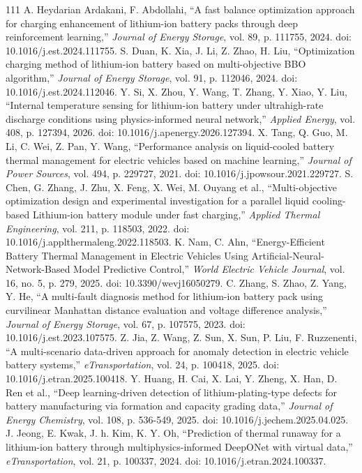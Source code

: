 \documentclass[journal]{IEEEtran}
\begin{document}
\begin{thebibliography}{111}
A. Heydarian Ardakani, F. Abdollahi, ``A fast balance optimization approach for charging enhancement of lithium-ion battery packs through deep reinforcement learning,'' \emph{Journal of Energy Storage}, vol. 89, p. 111755, 2024. doi: 10.1016/j.est.2024.111755.
S. Duan, K. Xia, J. Li, Z. Zhao, H. Liu, ``Optimization charging method of lithium-ion battery based on multi-objective BBO algorithm,'' \emph{Journal of Energy Storage}, vol. 91, p. 112046, 2024. doi: 10.1016/j.est.2024.112046.
Y. Si, X. Zhou, Y. Wang, T. Zhang, Y. Xiao, Y. Liu, ``Internal temperature sensing for lithium-ion battery under ultrahigh-rate discharge conditions using physics-informed neural network,'' \emph{Applied Energy}, vol. 408, p. 127394, 2026. doi: 10.1016/j.apenergy.2026.127394.
X. Tang, Q. Guo, M. Li, C. Wei, Z. Pan, Y. Wang, ``Performance analysis on liquid-cooled battery thermal management for electric vehicles based on machine learning,'' \emph{Journal of Power Sources}, vol. 494, p. 229727, 2021. doi: 10.1016/j.jpowsour.2021.229727.
S. Chen, G. Zhang, J. Zhu, X. Feng, X. Wei, M. Ouyang et al., ``Multi-objective optimization design and experimental investigation for a parallel liquid cooling-based Lithium-ion battery module under fast charging,'' \emph{Applied Thermal Engineering}, vol. 211, p. 118503, 2022. doi: 10.1016/j.applthermaleng.2022.118503.
K. Nam, C. Ahn, ``Energy-Efficient Battery Thermal Management in Electric Vehicles Using Artificial-Neural-Network-Based Model Predictive Control,'' \emph{World Electric Vehicle Journal}, vol. 16, no. 5, p. 279, 2025. doi: 10.3390/wevj16050279.
C. Zhang, S. Zhao, Z. Yang, Y. He, ``A multi-fault diagnosis method for lithium-ion battery pack using curvilinear Manhattan distance evaluation and voltage difference analysis,'' \emph{Journal of Energy Storage}, vol. 67, p. 107575, 2023. doi: 10.1016/j.est.2023.107575.
Z. Jia, Z. Wang, Z. Sun, X. Sun, P. Liu, F. Ruzzenenti, ``A multi-scenario data-driven approach for anomaly detection in electric vehicle battery systems,'' \emph{eTransportation}, vol. 24, p. 100418, 2025. doi: 10.1016/j.etran.2025.100418.
Y. Huang, H. Cai, X. Lai, Y. Zheng, X. Han, D. Ren et al., ``Deep learning-driven detection of lithium-plating-type defects for battery manufacturing via formation and capacity grading data,'' \emph{Journal of Energy Chemistry}, vol. 108, p. 536-549, 2025. doi: 10.1016/j.jechem.2025.04.025.
J. Jeong, E. Kwak, J. h. Kim, K. Y. Oh, ``Prediction of thermal runaway for a lithium-ion battery through multiphysics-informed DeepONet with virtual data,'' \emph{eTransportation}, vol. 21, p. 100337, 2024. doi: 10.1016/j.etran.2024.100337.

\end{thebibliography}
\end{document}
